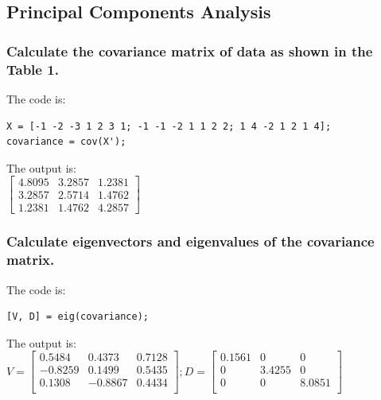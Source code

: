 \documentclass[paper=a4, fontsize=11pt]{scrartcl} %
\numberwithin{equation}{section} %
\numberwithin{figure}{section} %
\numberwithin{table}{section} %
\begin{document}

\subsection{Principal Components Analysis}


\subsubsection{Calculate the covariance matrix of data as shown in the Table 1.}

The code is:\\

\begin{lstlisting}
X = [-1 -2 -3 1 2 3 1; -1 -1 -2 1 1 2 2; 1 4 -2 1 2 1 4];
covariance = cov(X');
\end{lstlisting}

The output is:\\

$\begin{bmatrix} 
	4.8095 & 3.2857 & 1.2381\\
	3.2857 & 2.5714 & 1.4762\\
	1.2381 & 1.4762 & 4.2857
\end{bmatrix}$

\subsubsection{Calculate eigenvectors and eigenvalues of the covariance matrix.}

The code is:\\

\begin{lstlisting}
[V, D] = eig(covariance);
\end{lstlisting}

The output is:\\

$V=\begin{bmatrix} 
    0.5484 & 0.4373 & 0.7128\\
	-0.8259 & 0.1499 & 0.5435\\
	 0.1308 & -0.8867 & 0.4434\\
\end{bmatrix}; D=\begin{bmatrix} 
    0.1561 & 0 & 0\\
	0 & 3.4255 & 0\\
	0 & 0 & 8.0851\\
\end{bmatrix}$\\
\end{document}
